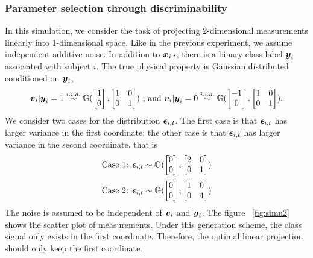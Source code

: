\documentclass{article}
\begin{document}
\subsubsection{Parameter selection through discriminability  }
In this simulation, we consider the task of projecting 2-dimensional measurements linearly into 1-dimensional space. Like in the previous experiment, we assume independent additive noise. In addition to $\boldsymbol{x}_{i,t}$, there is a binary class label $\boldsymbol{y}_{i}$ associated with subject $i$. The true physical property is Gaussian distributed conditioned on $\boldsymbol{y}_i$,
\[\boldsymbol{v}_i|\boldsymbol{y}_i=1 \overset{i.i.d.}{\sim} \mathbb{G}(\begin{bmatrix}1\\0\end{bmatrix},\begin{bmatrix}1& 0\\0& 1\end{bmatrix}) \text{ , and } \boldsymbol{v}_i|\boldsymbol{y}_i=0 \overset{i.i.d.}{\sim} \mathbb{G}(\begin{bmatrix}-1\\0\end{bmatrix},\begin{bmatrix}1& 0\\0& 1\end{bmatrix}) . \]
We consider two cases for the distribution $\boldsymbol{\epsilon}_{i,t}$. The first case is that $\boldsymbol{\epsilon}_{i,t}$ has larger variance in the first coordinate; the other case is that $\boldsymbol{\epsilon}_{i,t}$ has larger variance in the second coordinate, that is
\[ \text{Case 1: } \boldsymbol{\epsilon}_{i,t} \sim \mathbb{G}(\begin{bmatrix}0\\0\end{bmatrix},\begin{bmatrix}2& 0\\0& 1\end{bmatrix}) \]
\[ \text{Case 2: } \boldsymbol{\epsilon}_{i,t} \sim \mathbb{G}(\begin{bmatrix}0\\0\end{bmatrix},\begin{bmatrix}1& 0\\0& 4\end{bmatrix}) \]
The noise is assumed to be independent of $\boldsymbol{v}_i$ and $\boldsymbol{y}_i$. The figure ~\ref{fig:simu2} shows the scatter plot of measurements. Under this generation scheme, the class signal only exists in the first coordinate. Therefore, the optimal linear projection should only keep the first coordinate. \\
\end{document}
